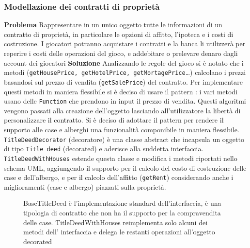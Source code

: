 \subsubsection{Modellazione dei contratti di proprietà}
\textbf{Problema}\newline
Rappresentare in un unico oggetto tutte le informazioni di un contratto di proprietà, in particolare le opzioni di affitto, l'ipoteca e i costi di costruzione.
I giocatori potranno acquistare i contratti e la banca li utilizzerà per reperire i costi delle operazioni del gioco, e addebitare o prelevare denaro dagli account dei giocatori\newline
\textbf{Soluzione}\newline
Analizzando le regole del gioco si è notato che i metodi  (\texttt{getHousePrice, getHotelPrice, getMortagePrice}\dots) 
calcolano i prezzi basandosi sul prezzo di vendita (\texttt{getSalePrice}) del contratto. Per implementare questi metodi in maniera flessibile 
si è deciso di usare il pattern :
i vari metodi  usano delle \texttt{Function} che prendono in input il prezzo di vendita. Questi algoritmi 
vengono passati alla creazione dell'oggetto lasciando all'utilizzatore la libertà di personalizzare il contratto.\newline
Si è deciso di adottare il pattern  per rendere il supporto alle case e alberghi una funzionalità componibile in
maniera flessibile.
\texttt{TitleDeedDecorator} (decoratore) è una classe abstract che incapsula un oggetto di tipo \texttt{Title deed} (decorated) e aderisce alla suddetta interfaccia. 
\texttt{TitleDeedWithHouses} estende questa classe e modifica i metodi riportati nello schema UML, aggiungendo il supporto per il calcolo del costo di costruzione delle case e dell'albergo, 
e per il calcolo dell'affitto (\texttt{getRent}) considerando anche i miglioramenti
(case e albergo) piazzati sulla proprietà.\newline
\begin{figure}[H]
    \centering
    \caption{BaseTitleDeed è l'implementazione standard dell'interfaccia, è una tipologia di 
    contratto che non ha il supporto per la compravendita delle case. TitleDeedWithHouses reimplementa solo alcuni dei metodi dell' interfaccia
    e delega le restanti operazioni all'oggetto decorated}
	\label{img:TitleDeed}
\end{figure}
